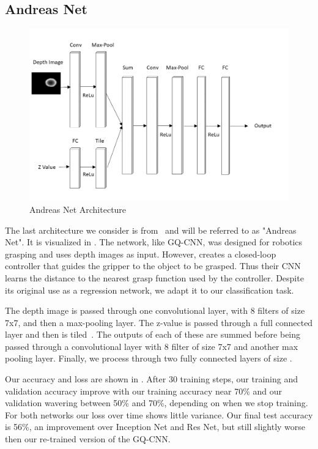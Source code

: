 \subsection{Andreas Net}

\begin{figure}[t!]
    \includegraphics[width=0.99\columnwidth]{figs/andreas_net.png}
\caption{Andreas Net Architecture} \label{fig:andreas_net}
\end{figure}

The last architecture we consider is from~\cite{viereck2017learning} and will be referred to as "Andreas Net". 
It is visualized in . 
The network, like GQ-CNN, was designed for robotics grasping and uses depth images as input. 
However, \cite{viereck2017learning} creates a closed-loop controller that guides the gripper to the object to be grasped. 
Thus their CNN learns the distance to the nearest grasp function used by the controller. 
Despite its original use as a regression network, we adapt it to our classification task. 

The depth image is passed through one convolutional layer, with 8 filters of size 7x7, and then a max-pooling layer. 
The z-value is passed through a full connected layer and then is tiled~\cite{ngiam2010tiled}.
 
The outputs of each of these are summed before being passed through a convolutional layer with 8 filter of size 7x7 and another max pooling layer. 
Finally, we process through two fully connected layers of size . 


Our accuracy and loss are shown in . 
After 30 training steps, our training and validation accuracy improve with our training accuracy near 70\% and our validation wavering between 50\% and 70\%, depending on when we stop training. 
For both networks our loss over time shows little variance. 
Our final test accuracy is 56\%, an improvement over Inception Net and Res Net, but still slightly worse then our re-trained version of the GQ-CNN. 

